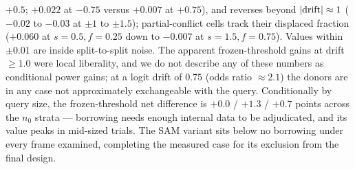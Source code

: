 \documentclass[11pt]{article}
\begin{document}
$+0.5$; $+0.022$ at $-0.75$ versus $+0.007$ at $+0.75$), and reverses
beyond $|{\rm drift}|
\approx 1$ ($-0.02$ to $-0.03$ at $\pm 1$ to $\pm 1.5$); partial-conflict
cells track their displaced fraction ($+0.060$ at $s{=}0.5, f{=}0.25$
down to $-0.007$ at $s{=}1.5, f{=}0.75$). Values within $\pm 0.01$ are
inside split-to-split noise. The apparent frozen-threshold gains at
drift $\ge 1.0$ were local liberality, and we do not describe any of
these numbers as conditional power gains; at a logit drift of $0.75$
(odds ratio $\approx 2.1$) the donors are in any case not approximately
exchangeable with the query.
Conditionally by query size, the frozen-threshold net difference
is $+0.0$ / $+1.3$ / $+0.7$ points across the $n_0$ strata --- borrowing
needs enough internal data to be adjudicated, and its value peaks in
mid-sized trials. The SAM variant sits below no borrowing under every
frame examined, completing the measured case for its exclusion from the
final design.
\end{document}
